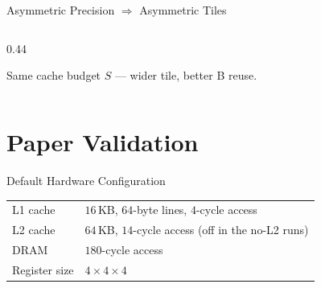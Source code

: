 \documentclass[aspectratio=169]{beamer}
\begin{document}
\begin{frame}{Asymmetric Precision $\Rightarrow$ Asymmetric Tiles}
\begin{columns}[c]
\begin{column}{0.44\textwidth}

      \vspace{2pt}
      {\small\color{gray} Same cache budget $S$ — wider tile, better B reuse.}
    \end{column}

  \end{columns}
\end{frame}

\section{Paper Validation}

\begin{frame}{Default Hardware Configuration}

  \renewcommand{\arraystretch}{1.3}
  \begin{tabular}{@{}ll@{}}
    \toprule
    L1 cache      & $16$\,KB, $64$-byte lines, $4$-cycle access \\
    L2 cache      & $64$\,KB, $14$-cycle access (off in the no-L2 runs) \\
    DRAM          & $180$-cycle access \\
    Register size & $4 \times 4 \times 4$ \\
    \bottomrule
  \end{tabular}


\end{frame}
\end{document}
